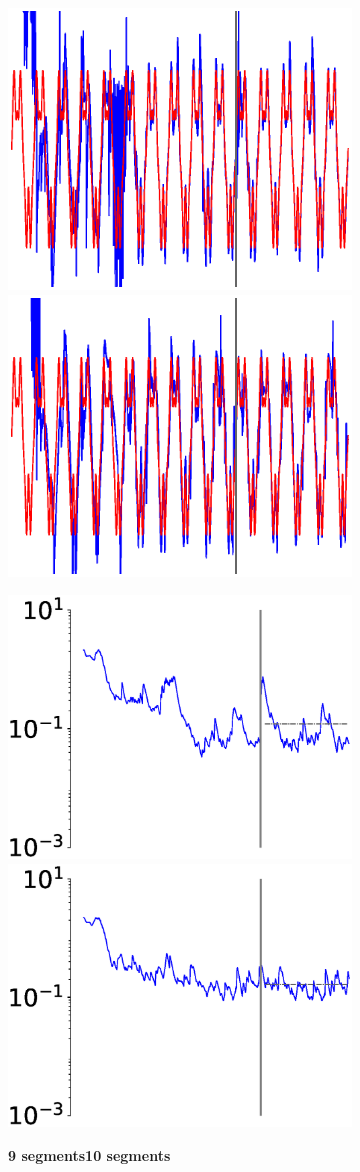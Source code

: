 \begin{figure}
\begin{subfigure}{\textwidth}
            \includegraphics[trim=2cm 1cm 2cm 1cm, clip=true,height=0.1\linewidth,width=.45\linewidth]{Figures/Fig_T6/ImprovP/ST_T2_Seg7_Var_CoordinateY.eps}    
            \includegraphics[trim=2cm 1cm 2cm 1cm, clip=true,height=0.1\linewidth,width=.45\linewidth]{Figures/Fig_T6/ImprovP/ST_T2_Seg8_Var_CoordinateY.eps} 

            \hspace{-1em}
            \includegraphics[height=0.15\linewidth,width=.45\linewidth]{Figures/Fig_T6/ImprovP/ST_T2_Seg7_Var_MSE.eps}
            \hspace{0em}
            \includegraphics[height=0.15\linewidth,width=.45\linewidth]{Figures/Fig_T6/ImprovP/ST_T2_Seg8_Var_MSE.eps}
            
            
        \end{subfigure}
        
        \textbf{}
        \begin{subfigure}{\textwidth}
            \centering
    
            \textbf{9 segments}\hspace{12em}\textbf{10 segments}
            
            
            

\end{subfigure}
\end{figure}
